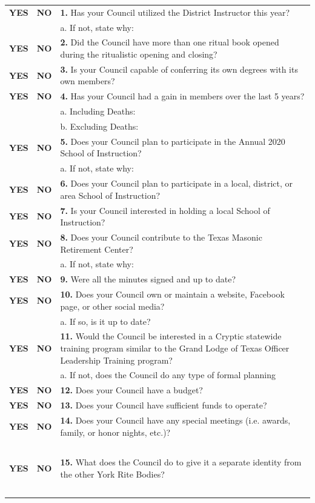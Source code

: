 \documentclass[letterpaper]{article}
\newcommand{\blank}[2]{
	\textField[\BG{0.95 0.95 0.95}\W{0}]{#1}{#2}{1em}
}
\newcommand{\chk}[1]{
	\radioButton[\BG{0.95 0.95 0.95}\W{0}]{myRadio}{8bp}{8bp}{#1}
}
\newcommand{\yesno}[2]{
	{\small\textbf{YES}} \chk{#1Yes} & {\small\textbf{NO}} \chk{#1No}  & \textbf{#1.} #2
}
\newcommand{\fllwNot}[2]{
	 & \, & \hspace*{4ex}#1. If not, state why: \blank{#2}{78ex}
}
\newcommand{\fllwYN}[3]{
	& \, & \hspace*{4ex}#1. #2\hspace*{4ex}{\small YES}\chk{#3Yes}\hspace*{4ex}{\small NO}\chk{#3No}
}
\newcommand{\fllwBox}[2]{
	& \, & \begin{minipage}{60ex}\textField[\BG{0.95 0.95 0.95}\W{0}]{#1}{104.5ex}{#2}\end{minipage}
}
\begin{document}
\begin{tabular}{p{0.55in}p{0.55in}p{6.3in}}
	\yesno{1}{Has your Council utilized the District Instructor this year?}\\
		\fllwNot{a}{DistrictInstructor}\\
	\yesno{2}{Did the Council have more than one ritual book opened during the ritualistic opening and closing?}\\
	\yesno{3}{Is your Council capable of conferring its own degrees with its own members?}\\
	\yesno{4}{Has your Council had a gain in members over the last 5 years?}\\
		\fllwYN{a}{Including Deaths:}{IncDeath}\\
		\fllwYN{b}{Excluding Deaths:}{ExDeath}\\
	\yesno{5}{Does your Council plan to participate in the Annual 2020 School of Instruction?}\\
		\fllwNot{a}{SOIAttend}\\
	\yesno{6}{Does your Council plan to participate in a local, district, or area School of Instruction?}\\
	\yesno{7}{Is your Council interested in holding a local School of Instruction?}\\
	\yesno{8}{Does your Council contribute to the Texas Masonic Retirement Center?}\\
		\fllwNot{a}{Contribute}\\
	\yesno{9}{Were all the minutes signed and up to date?}\\
	\yesno{10}{Does your Council own or maintain a website, Facebook page, or other social media?}\\
		\fllwYN{a}{If so, is it up to date?}{UpToDate}\\
	\yesno{11}{Would the Council be interested in a Cryptic statewide training program similar to the Grand Lodge of Texas Officer Leadership Training program?}\\
		\fllwYN{a}{If not, does the Council do any type of formal planning}{PlanningYN}\\
	\yesno{12}{Does your Council have a budget?}\\
	\yesno{13}{Does your Council have sufficient funds to operate?}\\
	\yesno{14}{Does your Council have any special meetings (i.e. awards, family, or honor nights, etc.)?}\\
		\fllwBox{SpecialNotes}{4em}\\
	\yesno{15}{What does the Council do to give it a separate identity from the other York Rite Bodies?}\\
		\fllwBox{IdentityNotes}{4em}\\
\end{tabular}
\end{document}
